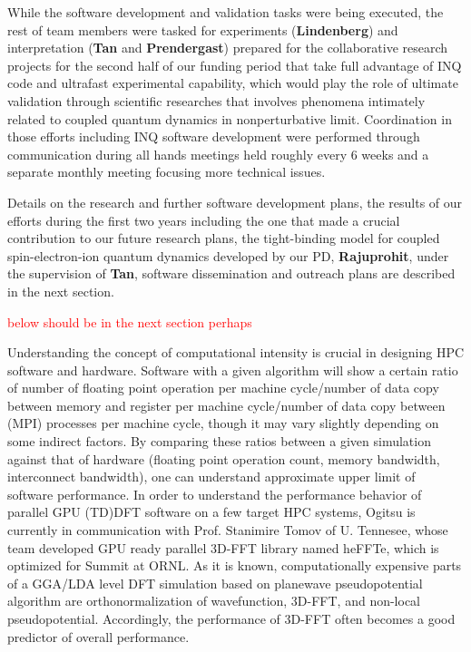 While the software development and validation tasks were being executed, the rest of team members were tasked for experiments ({\bf Lindenberg}) and interpretation ({\bf Tan} and {\bf Prendergast}) prepared for the collaborative research projects for the second half of our funding period that take full advantage of INQ code and ultrafast experimental capability, which would play the role of ultimate validation through scientific researches that involves phenomena intimately related to coupled quantum dynamics in nonperturbative limit. 
Coordination in those efforts including INQ software development were performed through communication during all hands meetings held roughly every 6 weeks and a separate monthly meeting focusing more technical issues.

Details on the research and further software development plans, the results of our efforts during the first two years including the one that made a crucial contribution to our future research plans, the tight-binding model for coupled spin-electron-ion quantum dynamics developed by our PD, {\bf Rajuprohit}, under the supervision of {\bf Tan}, software dissemination and outreach plans are described in the next section.
 
\clearpage

\textcolor{red}{below should be in the next section perhaps}

Understanding the concept of computational intensity is crucial in designing HPC software and hardware. 
Software with a given algorithm will show a certain ratio of number of floating point operation per machine cycle/number of data copy between memory and register per machine cycle/number of data copy between (MPI) processes per machine cycle, though it may vary slightly depending on some indirect factors.
By comparing these ratios between a given simulation against that of hardware (floating point operation count, memory bandwidth, interconnect bandwidth), one can understand approximate upper limit of software performance. 
In order to understand the performance behavior of parallel GPU (TD)DFT software on a few target HPC systems, Ogitsu is currently in communication with Prof. Stanimire Tomov of U. Tennesee, whose team developed GPU ready parallel 3D-FFT library named heFFTe, which is optimized for Summit at ORNL. 
As it is known, computationally expensive parts of a GGA/LDA level DFT simulation based on planewave pseudopotential algorithm are orthonormalization of wavefunction, 3D-FFT, and non-local pseudopotential. 
Accordingly, the performance of 3D-FFT often becomes a good predictor of overall performance.

\clearpage

